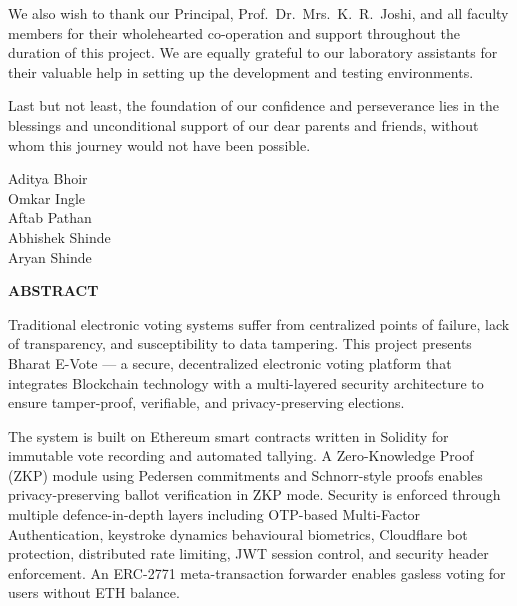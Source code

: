 \documentclass[oneside,a4paper,12pt]{book}
\begin{document}
\vspace{0.3cm}
We also wish to thank our Principal, Prof.\ Dr.\ Mrs.\ K.\ R.\ Joshi, and all faculty members for their wholehearted co-operation and support throughout the duration of this project. We are equally grateful to our laboratory assistants for their valuable help in setting up the development and testing environments.

\vspace{0.3cm}
Last but not least, the foundation of our confidence and perseverance lies in the blessings and unconditional support of our dear parents and friends, without whom this journey would not have been possible.

\vspace{1cm}
\begin{flushright}
Aditya Bhoir\\
Omkar Ingle\\
Aftab Pathan\\
Abhishek Shinde\\
Aryan Shinde
\end{flushright}

\clearpage

\begin{center}
{\bfseries \fontsize{16}{18}\selectfont ABSTRACT}
\end{center}
\vspace{0.5cm}
\thispagestyle{empty}

\setlength{\parindent}{11mm}

Traditional electronic voting systems suffer from centralized points of failure, lack of transparency, and susceptibility to data tampering. This project presents Bharat E-Vote --- a secure, decentralized electronic voting platform that integrates Blockchain technology with a multi-layered security architecture to ensure tamper-proof, verifiable, and privacy-preserving elections.

The system is built on Ethereum smart contracts written in Solidity for immutable vote recording and automated tallying. A Zero-Knowledge Proof (ZKP) module using Pedersen commitments and Schnorr-style proofs enables privacy-preserving ballot verification in ZKP mode. Security is enforced through multiple defence-in-depth layers including OTP-based Multi-Factor Authentication, keystroke dynamics behavioural biometrics, Cloudflare bot protection, distributed rate limiting, JWT session control, and security header enforcement. An ERC-2771 meta-transaction forwarder enables gasless voting for users without ETH balance.
\end{document}
